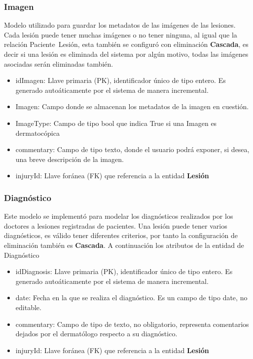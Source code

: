 \subsubsection{Imagen}
Modelo utilizado para guardar los metadatos\cite{metadato} de las im\'agenes de las lesiones.
Cada lesi\'on puede tener muchas im\'agenes o no tener ninguna, al igual que la relaci\'on Paciente~Lesi\'on,
esta tambi\'en se configur\'o con eliminaci\'on \textbf{Cascada}, es decir si una lesi\'on
es eliminada del sistema por alg\'un motivo, todas las im\'agenes asociadas ser\'an eliminadas tambi\'en.
\begin{itemize}
    \item idImagen: Llave primaria (PK), identificador \'unico de tipo entero. Es generado auto\'aticamente por el sistema de manera incremental.
    \item Imagen: Campo donde se almacenan los metadatos de la imagen en cuesti\'on.
    \item ImageType: Campo de tipo bool que indica True si una Imagen es dermatoc\'opica
    \item commentary: Campo de tipo texto, donde el usuario podr\'a exponer, si desea, una breve descripci\'on de la imagen. 
    \item injuryId: Llave for\'anea (FK) que referencia a la entidad \textbf{Lesi\'on}
\end{itemize}

\subsubsection{Diagnóstico}
Este modelo se implement\'o para modelar los diagn\'osticos realizados por los doctores 
a lesiones registradas de pacientes. Una lesi\'on puede tener varios diagn\'osticos, 
es v\'alido tener diferentes criterios, por tanto la configuraci\'on de eliminaci\'on
tambi\'en es \textbf{Cascada}. A continuaci\'on los atributos de la entidad de Diagn\'ostico
\begin{itemize}
    \item idDiagnosis: Llave primaria (PK), identificador \'unico de tipo entero. Es generado auto\'aticamente por el sistema de manera incremental.
    \item date: Fecha en la que se realiza el diagn\'ostico. Es un campo de tipo date, no editable.
    \item commentary: Campo de tipo de texto, no obligatorio, representa comentarios dejados por el dermat\'ologo respecto a su diagn\'ostico.
    \item injuryId: Llave for\'anea (FK) que referencia a la entidad \textbf{Lesi\'on}
\end{itemize}